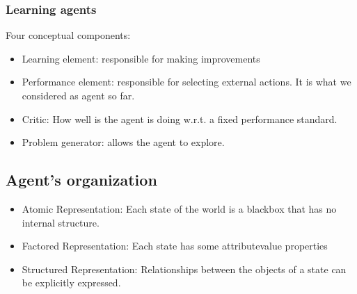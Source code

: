\subsubsection{Learning agents}

Four conceptual components:
\begin{itemize}
  \item Learning element: responsible for making improvements
  \item Performance element: responsible for selecting external
    actions. It is what we considered as agent so far.
  \item Critic: How well is the agent is doing w.r.t. a fixed
    performance standard.
  \item Problem generator: allows the agent to explore.
\end{itemize}

\subsection{Agent's organization}

\begin{itemize}
  \item Atomic Representation: Each state of the world is a
    blackbox that has no internal structure. 
  \item  Factored Representation: Each state has some
    attributevalue properties
  \item Structured Representation: Relationships between the
    objects of a state can be explicitly expressed. 
\end{itemize}
